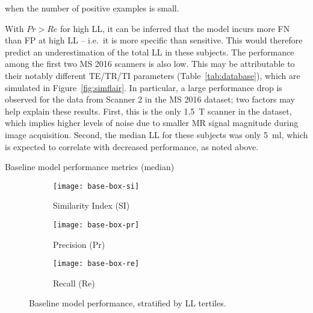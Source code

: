when the number of positive examples is small.
\par
With $Pr > Re$ for high LL, it can be inferred that %
the model incurs more FN than FP at high LL -- i.e.\ it is more specific than sensitive.
This would therefore predict an underestimation of the total LL in these subjects.
The performance among the first two MS 2016 scanners is also low.
This may be attributable to their notably different TE/TR/TI parameters
(Table~\ref{tab:database}), which are simulated in Figure~\ref{fig:simflair}.
In particular, a large performance drop is observed for
the data from Scanner 2 in the MS 2016 dataset;
two factors may help explain these results.
First, this is the only \SI{1.5}{\tesla} scanner in the dataset,
which implies higher levels of noise due to
smaller MR signal magnitude during image acquisition.
Second, the median LL for these subjects was only \SI{5}{\milli\litre},
which is expected to correlate with decreased performance, as noted above.
\par
\begin{table}
  \centering
  \caption{Baseline model performance metrics (median)}%
  \label{tab:seg-base}
  
\end{table}
\begin{figure}
  \centering
  \begin{subfigure}{0.32\textwidth}
    \centering
    \texttt{[image: base-box-si]}
    \caption{Similarity Index (SI)}%
    \label{fig:seg-base-si}
  \end{subfigure}
  \begin{subfigure}{0.32\textwidth}
    \centering
    \texttt{[image: base-box-pr]}
    \caption{Precision (Pr)}%
    \label{fig:seg-base-pr}
  \end{subfigure}
  \begin{subfigure}{0.32\textwidth}
    \centering
    \texttt{[image: base-box-re]}
    \caption{Recall (Re)}%
    \label{fig:seg-base-re}
  \end{subfigure}
  \caption{Baseline model performance, stratified by LL tertiles.}%
  \label{fig:seg-base}
\end{figure}
